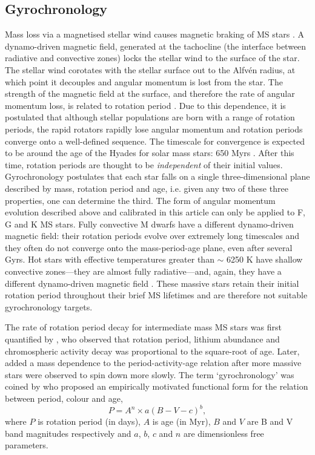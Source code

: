 \documentclass[useAMS, usenatbib]{mn2e}
\begin{document}
\subsection{Gyrochronology}

Mass loss via a magnetised stellar wind causes magnetic braking of MS stars
\citep{Weber1967}.
A dynamo-driven magnetic field, generated at the tachocline (the interface
between radiative and convective zones) locks the stellar wind to the surface
of the star.
The stellar wind corotates with the stellar surface out to the Alfv\'{e}n
radius, at which point it decouples and angular momentum is lost from the
star.
The strength of the magnetic field at the surface, and therefore the rate of
angular momentum loss, is related to rotation period \citep{Kawaler1988}.
Due to this dependence, it is postulated that although stellar populations
are born with a range of rotation periods, the rapid rotators rapidly lose
angular momentum and rotation periods converge onto a well-defined sequence.
The timescale for convergence is expected to be around the age of the Hyades
for solar mass stars: 650 Myrs \citep{Radick1987, Irwin2009}.
After this time, rotation periods are thought to be \emph{independent} of their
initial values.  %
Gyrochronology postulates that each star falls on a single three-dimensional
plane described by mass, rotation period and age, i.e. given any two of these
three properties, one can determine the third.
The form of angular momentum evolution described above and calibrated in this
article can only be applied to F, G and K MS stars.
Fully convective M dwarfs have a different dynamo-driven magnetic field: their
rotation periods evolve over extremely long timescales and they often do not
converge onto the mass-period-age plane, even after several Gyrs.
Hot stars with effective temperatures greater than $\sim$ 6250 K have shallow
convective zones---they are almost fully radiative---and, again, they have
a different dynamo-driven magnetic field \citep{Kraft1967}.
These massive stars retain their initial rotation period throughout their
brief MS lifetimes and are therefore not suitable gyrochronology targets.

The rate of rotation period decay for intermediate mass MS stars was first
quantified by \citet{Skumanich1972}, who observed that rotation period,
lithium abundance and chromospheric activity decay was proportional to the
square-root of age.
Later, \citet{Noyes1984_2} added a mass dependence to the period-activity-age
relation after more massive stars were observed to spin down more slowly.
The term `gyrochronology' was coined by \citet{Barnes2003} who proposed an
empirically motivated functional form for the relation between period, colour
and age, \begin{equation} \label{eq:Barnes2007_2} P = A^n \times a(B-V-c)^b,
\end{equation} where $P$ is rotation period (in days), $A$ is age (in Myr),
$B$ and $V$ are B and V band magnitudes respectively and $a$, $b$, $c$ and $n$
are dimensionless free parameters.  %
\end{document}
